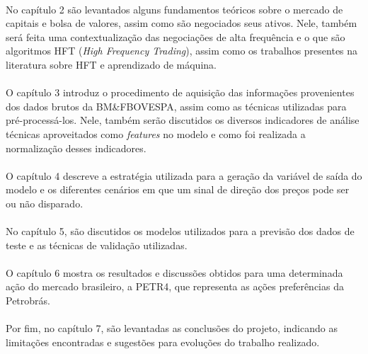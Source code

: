 \documentclass[grad,numbers]{coppe}
\begin{document}
    \paragraph{}No capítulo 2 são levantados alguns fundamentos teóricos sobre o mercado de capitais e bolsa de valores, assim como são negociados seus ativos. Nele, também será feita uma contextualização das negociações de alta frequência e o que são algoritmos HFT (\textit{High Frequency Trading}), assim como os trabalhos presentes na literatura sobre HFT e aprendizado de máquina.
    
    \paragraph{}O capítulo 3 introduz o procedimento de aquisição das informações provenientes dos dados brutos da BM\&FBOVESPA, assim como as técnicas utilizadas para pré-processá-los. Nele, também serão discutidos os diversos indicadores de análise técnicas aproveitados como \textit{features} no modelo e como foi realizada a normalização desses indicadores.
    
    \paragraph{}O capítulo 4 descreve a estratégia utilizada para a geração da variável de saída do modelo e os diferentes cenários em que um sinal de direção dos preços pode ser ou não disparado.
    
    \paragraph{}No capítulo 5, são discutidos os modelos utilizados para a previsão dos dados de teste e as técnicas de validação utilizadas.
    
    \paragraph{}O capítulo 6 mostra os resultados e discussões obtidos para uma determinada ação do mercado brasileiro, a PETR4, que representa as ações preferências da Petrobrás.
    
    \paragraph{}Por fim, no capítulo 7, são levantadas as conclusões do projeto, indicando as limitações encontradas e sugestões para evoluções do trabalho realizado.
  
\end{document}
